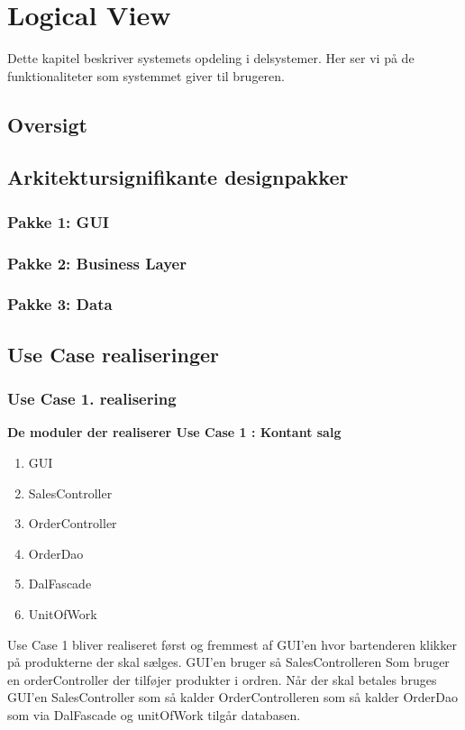 \section{Logical View}
Dette kapitel beskriver systemets opdeling i delsystemer. Her ser vi på de funktionaliteter som systemmet giver til brugeren. 

\subsection{Oversigt}

\subsection{Arkitektursignifikante designpakker	}
\subsubsection{Pakke 1: GUI}

\subsubsection{Pakke 2: Business Layer}


\subsubsection{Pakke 3: Data}


\subsection{Use Case realiseringer	}
\subsubsection{ Use Case 1. realisering	}
\textbf{De moduler der realiserer Use Case 1 : Kontant salg}

\begin{enumerate}
	\item GUI
	\item SalesController
	\item OrderController
	\item OrderDao
	\item DalFascade
	\item UnitOfWork
\end{enumerate}

Use Case 1 bliver realiseret først og fremmest af GUI'en hvor bartenderen klikker på produkterne der skal sælges. GUI'en bruger så SalesControlleren Som bruger en orderController der tilføjer produkter i ordren. Når der skal betales bruges GUI'en SalesController som så kalder OrderControlleren som så kalder OrderDao som via DalFascade og unitOfWork tilgår databasen.  


